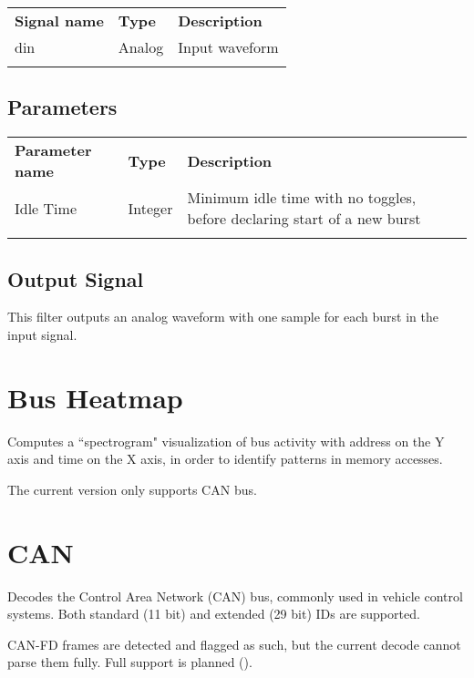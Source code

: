 \begin{tabularx}{16cm}{llX}
\thickhline
\textbf{Signal name} & \textbf{Type} & \textbf{Description} \\
\thickhline
din & Analog & Input waveform \\
\thickhline
\end{tabularx}

\subsection{Parameters}

\begin{tabularx}{16cm}{llX}
\thickhline
\textbf{Parameter name} & \textbf{Type} & \textbf{Description} \\
\thickhline
Idle Time & Integer & Minimum idle time with no toggles, before declaring start of a new burst\\
\thickhline
\end{tabularx}

\subsection{Output Signal}

This filter outputs an analog waveform with one sample for each burst in the input signal.

\pagebreak
\section{Bus Heatmap}

Computes a ``spectrogram" visualization of bus activity with address on the Y axis and time on the X axis, in order to
identify patterns in memory accesses.

The current version only supports CAN bus.

\pagebreak
\section{CAN}
\label{filter:can}

Decodes the Control Area Network (CAN) bus, commonly used in vehicle control systems. Both standard (11 bit) and
extended (29 bit) IDs are supported.

CAN-FD frames are detected and flagged as such, but the current decode cannot parse them fully. Full support is planned
().

